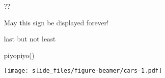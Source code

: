 \documentclass[
  ignorenonframetext,
]{beamer}
\newenvironment{Shaded}{\begin{snugshade}}{\end{snugshade}}
\newcommand{\FunctionTok}[1]{\textcolor[rgb]{0.00,0.00,0.00}{#1}}
\newcommand{\NormalTok}[1]{#1}
\let\oldShaded\Shaded
\let\endoldShaded\endShaded
\renewenvironment{Shaded}{\footnotesize\oldShaded}{\endoldShaded}
\begin{document}
\begin{frame}{??}
\protect\hypertarget{section}{}
\Huge

\end{frame}

\begin{frame}{May this sign be displayed forever!}
\protect\hypertarget{may-this-sign-be-displayed-forever}{}
\vspace*{-4pt}
\end{frame}

\begin{frame}[fragile]{last but not least}
\protect\hypertarget{last-but-not-least}{}
\begin{Shaded}
\begin{Highlighting}[]
\FunctionTok{piyopiyo}\NormalTok{()}
\end{Highlighting}
\end{Shaded}

\texttt{[image: slide\_files/figure-beamer/cars-1.pdf]}
\end{frame}
\end{document}
